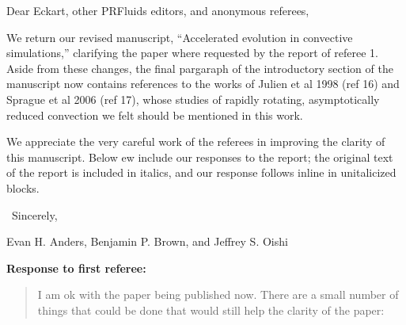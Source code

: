 \documentclass[aps, 11pt, singlecolumn]{revtex4-1} %
\begin{document}
\newenvironment{myquotation}{
\begin{quotation}
\itshape
}{ 
\end{quotation}
}
\noindent
Dear Eckart, other PRFluids editors, and anonymous referees,
$\,$\newline

\begin{singlespace}
We return our revised manuscript, ``Accelerated evolution in convective simulations,''
clarifying the paper where requested by the report of referee 1. 
Aside from these changes, the 
final pargaraph of the introductory section of the 
manuscript now contains references to the works of
Julien et al 1998 (ref 16) and Sprague et al 2006 (ref 17), whose studies of
rapidly rotating, asymptotically reduced convection 
we felt should be mentioned in this work.

We appreciate the very careful work of the referees in improving the clarity of
this manuscript. Below ew include our responses to the report; the original
text of the report is included in italics, and our response follows inline in
unitalicized blocks.

$\,$\newline
\noindent
Sincerely,

Evan H. Anders, Benjamin P. Brown, and Jeffrey S. Oishi




\newpage
\noindent
\Large{\textbf{Response to first referee:}}\newline$\,$\newline\indent

\begin{myquotation}
I am ok with the paper being published now.   There are a small number of things
that could be done that would still help the clarity of the paper:


\end{myquotation}
\end{singlespace}
\end{document}
